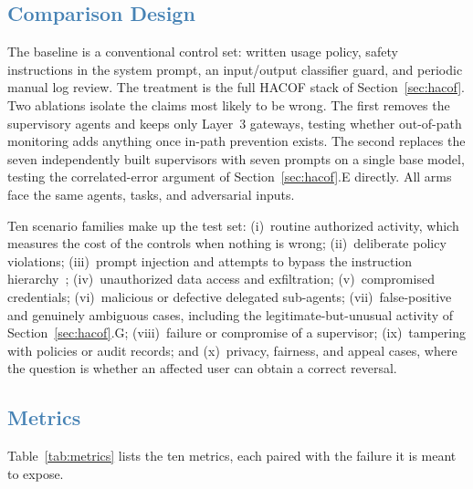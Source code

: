\documentclass[journal]{IEEEtran}
\newcommand{\hacof}{HACOF}
\begin{document}
\subsection{\textcolor{steelblue}{Comparison Design}}

The baseline is a conventional control set: written usage policy, safety instructions in the system prompt, an input/output classifier guard, and periodic manual log review. The treatment is the full \hacof{} stack of Section~\ref{sec:hacof}. Two ablations isolate the claims most likely to be wrong. The first removes the supervisory agents and keeps only Layer~3 gateways, testing whether out-of-path monitoring adds anything once in-path prevention exists. The second replaces the seven independently built supervisors with seven prompts on a single base model, testing the correlated-error argument of Section~\ref{sec:hacof}.E directly. All arms face the same agents, tasks, and adversarial inputs.

Ten scenario families make up the test set: (i)~routine authorized activity, which measures the cost of the controls when nothing is wrong; (ii)~deliberate policy violations; (iii)~prompt injection and attempts to bypass the instruction hierarchy~\cite{greshake2023injection,wallace2024hierarchy};
(iv)~unauthorized data access and exfiltration; (v)~compromised credentials; (vi)~malicious or defective delegated sub-agents; (vii)~false-positive and genuinely ambiguous cases, including the legitimate-but-unusual activity of Section~\ref{sec:hacof}.G; (viii)~failure or compromise of a supervisor; (ix)~tampering with policies or audit records; and (x)~privacy, fairness, and appeal cases, where the question is whether an affected user can obtain a correct reversal.

\subsection{\textcolor{steelblue}{Metrics}}

Table~\ref{tab:metrics} lists the ten metrics, each paired with the failure it is meant to expose.
\end{document}
